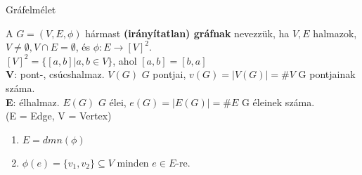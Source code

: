 
\begin{frame}[plain]
\begin{tcolorbox}[center, colback={myyellow}, coltext={black}, colframe={myyellow}]
    {\Huge Gráfelmélet}
\end{tcolorbox}
\end{frame}


\begin{frame}

\begin{tcolorbox}[title={Gráf}]
A $G = (V, E, {\phi})$ hármast \textbf{(irányítatlan) gráfnak} nevezzük, ha $V, E$ halmazok, $V \neq \emptyset, V \cap E = \emptyset$, és $\phi : E \rightarrow [V]^2$.\\
\mbigskip
$[V]^2 = \{ [a, b] | a, b \in V \}$, ahol $[a, b] = [b, a]$\\
\mbigskip
\textbf{V}: pont-, csúcshalmaz. $V(G)$ $G$ pontjai, $v(G) = |V(G)| = \#V$ G pontjainak száma.\\
\mbigskip
\textbf{E}: élhalmaz. $E(G)$ $G$ élei, $e(G) = |E(G)| = \#E$ G éleinek száma.\\
\mbigskip
(E = Edge, V = Vertex)
\end{tcolorbox}

\begin{tcolorbox}[title={Ész}]
\begin{enumerate}
\item $E = dmn({\phi})$
\item ${\phi}(e) = \{v_1, v_2\} \subseteq V$ minden $e \in E$-re.
\end{enumerate}
\end{tcolorbox}

\end{frame}


